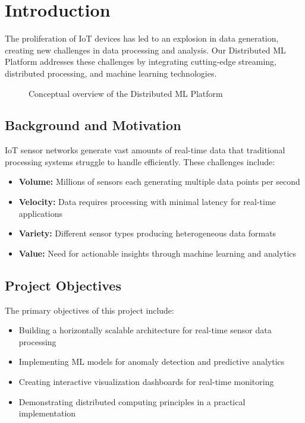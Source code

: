 \documentclass[11pt, a4paper]{article}
\begin{document}
\tableofcontents
\clearpage

\section{Introduction}
The proliferation of IoT devices has led to an explosion in data generation, creating new challenges in data processing and analysis. Our Distributed ML Platform addresses these challenges by integrating cutting-edge streaming, distributed processing, and machine learning technologies.

\begin{figure}[h]
  \centering
  \caption{Conceptual overview of the Distributed ML Platform}
  \label{fig:overview}
\end{figure}

\subsection{Background and Motivation}
IoT sensor networks generate vast amounts of real-time data that traditional processing systems struggle to handle efficiently. These challenges include:

\begin{itemize}[leftmargin=*]
  \item \textbf{Volume:} Millions of sensors each generating multiple data points per second
  \item \textbf{Velocity:} Data requires processing with minimal latency for real-time applications
  \item \textbf{Variety:} Different sensor types producing heterogeneous data formats
  \item \textbf{Value:} Need for actionable insights through machine learning and analytics
\end{itemize}

\subsection{Project Objectives}
The primary objectives of this project include:
\begin{itemize}[leftmargin=*]
  \item Building a horizontally scalable architecture for real-time sensor data processing
  \item Implementing ML models for anomaly detection and predictive analytics
  \item Creating interactive visualization dashboards for real-time monitoring
  \item Demonstrating distributed computing principles in a practical implementation
\end{itemize}
\end{document}
